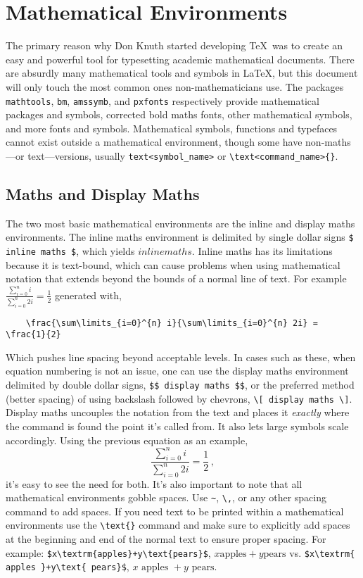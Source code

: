 \chapter{Mathematical Environments}
%
The primary reason why Don Knuth started developing \TeX~was to create an easy and powerful tool for typesetting academic mathematical documents. There are absurdly many mathematical tools and symbols in \LaTeX, but this document will only touch the most common ones non-mathematicians use. The packages \verb|mathtools|, \verb|bm|, \verb|amssymb|, and \verb|pxfonts| respectively provide mathematical packages and symbols, corrected bold maths fonts, other mathematical symbols, and more fonts and symbols. Mathematical symbols, functions and typefaces cannot exist outside a mathematical environment, though some have non-maths---or text---versions, usually \verb|text<symbol_name>| or \verb|\text<command_name>{}|.
%
\section{Maths and Display Maths}
%
The two most basic mathematical environments are the inline and display maths environments. The inline maths environment is delimited by single dollar signs \verb|$ inline maths $|, which yields $ inline maths $. Inline maths has its limitations because it is text-bound, which can cause problems when using mathematical notation that extends beyond the bounds of a normal line of text. For example $ \frac{\sum\limits_{i=0}^{n} i}{\sum\limits_{i=0}^{n} 2i} = \frac{1}{2} $ generated with,
\begin{verbatim}
	\frac{\sum\limits_{i=0}^{n} i}{\sum\limits_{i=0}^{n} 2i} = \frac{1}{2}
\end{verbatim}
Which pushes line spacing beyond acceptable levels. In cases such as these, when equation numbering is not an issue, one can use the display maths environment delimited by double dollar signs, \verb|$$ display maths $$|, or the preferred method (better spacing) of using backslash followed by chevrons, \verb|\[ display maths \]|. Display maths uncouples the notation from the text and places it \emph{exactly} where the command is found the point it's called from. It also lets large symbols scale accordingly. Using the previous equation as an example, \[ \frac{\sum\limits_{i=0}^{n} i}{\sum\limits_{i=0}^{n} 2i} = \frac{1}{2}\,, \] it's easy to see the need for both. It's also important to note that all mathematical environments gobble spaces. Use \verb|~|, \verb|\,|, or any other spacing command to add spaces. If you need text to be printed within a mathematical environments use the \verb|\text{}| command and make sure to explicitly add spaces at the beginning and end of the normal text to ensure proper spacing. For example: \verb|$x\textrm{apples}+y\text{pears}$|, $x\textrm{apples}+y\text{pears}$ vs. \verb|$x\textrm{ apples }+y\text{ pears}$|, $x\textrm{ apples }+y\text{ pears}$.
%
